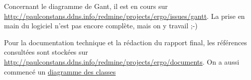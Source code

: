 \documentclass[12pt]{cours}
\begin{document}
Concernant le diagramme de Gant, il est en cours sur \url{http://paulconstans.ddns.info/redmine/projects/ergo/issues/gantt}. La prise en main du logiciel n'est pas encore complète, mais on y travail ;-)

Pour la documentation technique et la rédaction du rapport final, les références consultées sont stockées sur \url{http://paulconstans.ddns.info/redmine/projects/ergo/documents}. On a aussi commencé un \href{http://paulconstans.ddns.info/redmine/projects/ergo/repository/revisions/master/raw/diagramme%20des%20classes.pdf}{diagramme des classes}
\end{document}
